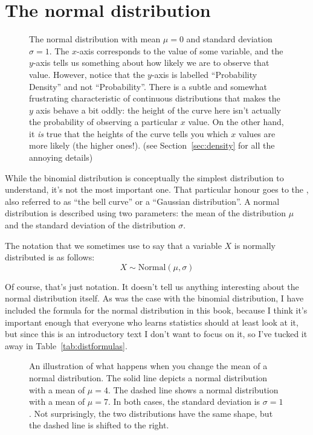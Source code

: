 \section{The normal distribution\label{sec:normal}}

\begin{figure}[t]
\begin{center}
\caption{The normal distribution with mean $\mu = 0$ and standard deviation $\sigma = 1$. The $x$-axis corresponds to the value of some variable, and the $y$-axis tells us something about how likely we are to observe that value. However, notice that the $y$-axis is labelled ``Probability Density'' and not ``Probability''. There is a subtle and somewhat frustrating characteristic of continuous distributions that makes the $y$ axis behave a bit oddly: the height of the curve here isn't actually the probability of observing a particular $x$ value. On the other hand, it {\it is} true that the heights of the curve tells you which $x$ values are more likely (the higher ones!). (see Section~\ref{sec:density} for all the annoying details)}
\HR
\label{fig:normdist}
\end{center}
\end{figure}

While the binomial distribution is conceptually the simplest distribution to understand, it's not the most important one. That particular honour goes to the , also referred to as ``the bell curve'' or a ``Gaussian distribution''. A normal distribution is described using two parameters: the mean of the distribution $\mu$ and the standard deviation of the distribution $\sigma$. 

The notation that we sometimes use to say that a variable $X$ is normally distributed is as follows:
$$
X \sim \mbox{Normal}(\mu,\sigma)
$$

Of course, that's just notation. It doesn't tell us anything interesting about the normal distribution itself. As was the case with the binomial distribution, I have included the formula for the normal distribution in this book, because I think it's important enough that everyone who learns statistics should at least look at it, but since this is an introductory text I don't want to focus on it, so I've tucked it away in Table~\ref{tab:distformulas}. 

\begin{figure}[t]
\begin{center}
\caption{An illustration of what happens when you change the mean of a normal distribution. The solid line depicts a normal distribution with a mean of $\mu=4$. The dashed line shows a normal distribution with a mean of $\mu=7$. In both cases, the standard deviation is $\sigma=1$. Not surprisingly, the two distributions have the same shape, but the dashed line is shifted to the right.}
\label{fig:normmean}
\HR
\end{center}
\end{figure}

